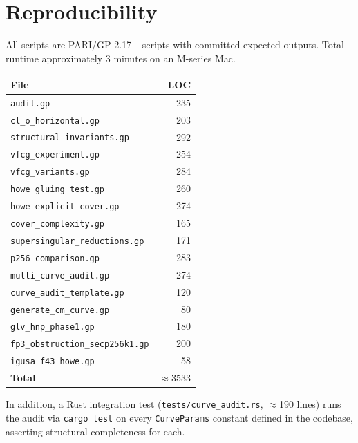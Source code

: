 \documentclass[11pt,a4paper]{article}
\theoremstyle{definition}
\begin{document}
\section{Reproducibility}

All scripts are PARI/GP 2.17+ scripts with committed expected
outputs. Total runtime approximately 3 minutes on an M-series Mac.

\begin{center}
\small
\begin{tabular}{lr}
\toprule
File & LOC \\
\midrule
\texttt{audit.gp} & 235 \\
\texttt{cl\_o\_horizontal.gp} & 203 \\
\texttt{structural\_invariants.gp} & 292 \\
\texttt{vfcg\_experiment.gp} & 254 \\
\texttt{vfcg\_variants.gp} & 284 \\
\texttt{howe\_gluing\_test.gp} & 260 \\
\texttt{howe\_explicit\_cover.gp} & 274 \\
\texttt{cover\_complexity.gp} & 165 \\
\texttt{supersingular\_reductions.gp} & 171 \\
\texttt{p256\_comparison.gp} & 283 \\
\texttt{multi\_curve\_audit.gp} & 274 \\
\texttt{curve\_audit\_template.gp} & 120 \\
\texttt{generate\_cm\_curve.gp} & 80 \\
\texttt{glv\_hnp\_phase1.gp} & 180 \\
\texttt{fp3\_obstruction\_secp256k1.gp} & 200 \\
\texttt{igusa\_f43\_howe.gp} & 58 \\
\midrule
\textbf{Total} & \textbf{$\approx 3533$} \\
\bottomrule
\end{tabular}
\end{center}

In addition, a Rust integration test
(\texttt{tests/curve\_audit.rs}, $\approx$190 lines) runs the audit
via \texttt{cargo test} on every \texttt{CurveParams} constant
defined in the codebase, asserting structural completeness for each.
\end{document}
